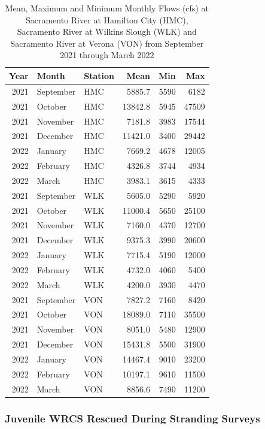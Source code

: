 \documentclass[
]{book}
\theoremstyle{definition}
\theoremstyle{definition}
\theoremstyle{definition}
\theoremstyle{definition}
\theoremstyle{remark}
\begin{document}
\begin{table}
\centering
\caption{Mean, Maximum and Minimum Monthly Flows (cfs) at Sacramento River at Hamilton City (HMC), Sacramento River at Wilkins Slough (WLK) and Sacramento River at Verona (VON) from September 2021  through March 2022}
\centering
\begin{tabular}[t]{rllrrr}
\hline
Year & Month & Station & Mean & Min & Max\\
\hline
2021 & September & HMC & 5885.7 & 5590 & 6182\\
\hline
2021 & October & HMC & 13842.8 & 5945 & 47509\\
\hline
2021 & November & HMC & 7181.8 & 3983 & 17544\\
\hline
2021 & December & HMC & 11421.0 & 3400 & 29442\\
\hline
2022 & January & HMC & 7669.2 & 4678 & 12005\\
\hline
2022 & February & HMC & 4326.8 & 3744 & 4934\\
\hline
2022 & March & HMC & 3983.1 & 3615 & 4333\\
\hline
2021 & September & WLK & 5605.0 & 5290 & 5920\\
\hline
2021 & October & WLK & 11000.4 & 5650 & 25100\\
\hline
2021 & November & WLK & 7160.0 & 4370 & 12700\\
\hline
2021 & December & WLK & 9375.3 & 3990 & 20600\\
\hline
2022 & January & WLK & 7715.4 & 5190 & 12000\\
\hline
2022 & February & WLK & 4732.0 & 4060 & 5400\\
\hline
2022 & March & WLK & 4200.0 & 3930 & 4470\\
\hline
2021 & September & VON & 7827.2 & 7160 & 8420\\
\hline
2021 & October & VON & 18089.0 & 7110 & 35500\\
\hline
2021 & November & VON & 8051.0 & 5480 & 12900\\
\hline
2021 & December & VON & 15431.8 & 5500 & 31900\\
\hline
2022 & January & VON & 14467.4 & 9010 & 23200\\
\hline
2022 & February & VON & 10197.1 & 9610 & 11500\\
\hline
2022 & March & VON & 8856.6 & 7490 & 11200\\
\hline
\end{tabular}
\end{table}

\hypertarget{juvenile-wrcs-rescued-during-stranding-surveys}{%
\subsubsection{Juvenile WRCS Rescued During Stranding Surveys}\label{juvenile-wrcs-rescued-during-stranding-surveys}}
\end{document}
